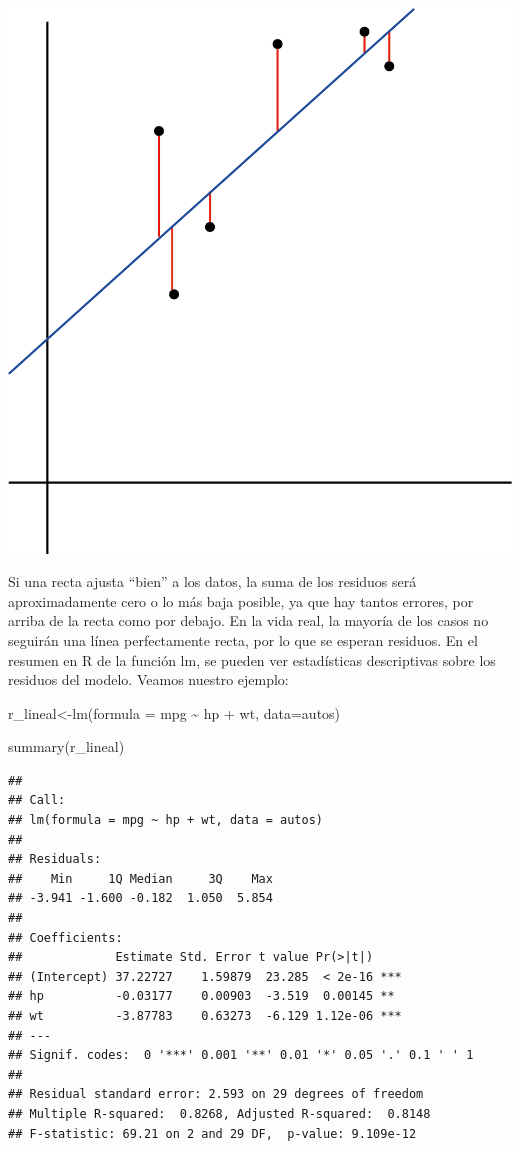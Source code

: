 \documentclass[
]{book}
\newenvironment{Shaded}{\begin{snugshade}}{\end{snugshade}}
\newcommand{\AttributeTok}[1]{\textcolor[rgb]{0.77,0.63,0.00}{#1}}
\newcommand{\FunctionTok}[1]{\textcolor[rgb]{0.00,0.00,0.00}{#1}}
\newcommand{\NormalTok}[1]{#1}
\newcommand{\OtherTok}[1]{\textcolor[rgb]{0.56,0.35,0.01}{#1}}
\newcommand{\SpecialCharTok}[1]{\textcolor[rgb]{0.00,0.00,0.00}{#1}}
\begin{document}
\includegraphics[width=14.24in]{img/res}

Si una recta ajusta ``bien'' a los datos, la suma de los residuos será aproximadamente cero o lo más baja posible, ya que hay tantos errores, por arriba de la recta como por debajo. En la vida real, la mayoría de los casos no seguirán una línea perfectamente recta, por lo que se esperan residuos. En el resumen en R de la función lm, se pueden ver estadísticas descriptivas sobre los residuos del modelo. Veamos nuestro ejemplo:

\begin{Shaded}
\begin{Highlighting}[]
\NormalTok{r\_lineal}\OtherTok{\textless{}{-}}\FunctionTok{lm}\NormalTok{(}\AttributeTok{formula =}\NormalTok{ mpg }\SpecialCharTok{\textasciitilde{}}\NormalTok{ hp }\SpecialCharTok{+}\NormalTok{ wt, }\AttributeTok{data=}\NormalTok{autos)}

\FunctionTok{summary}\NormalTok{(r\_lineal)}
\end{Highlighting}
\end{Shaded}

\begin{verbatim}
## 
## Call:
## lm(formula = mpg ~ hp + wt, data = autos)
## 
## Residuals:
##    Min     1Q Median     3Q    Max 
## -3.941 -1.600 -0.182  1.050  5.854 
## 
## Coefficients:
##             Estimate Std. Error t value Pr(>|t|)    
## (Intercept) 37.22727    1.59879  23.285  < 2e-16 ***
## hp          -0.03177    0.00903  -3.519  0.00145 ** 
## wt          -3.87783    0.63273  -6.129 1.12e-06 ***
## ---
## Signif. codes:  0 '***' 0.001 '**' 0.01 '*' 0.05 '.' 0.1 ' ' 1
## 
## Residual standard error: 2.593 on 29 degrees of freedom
## Multiple R-squared:  0.8268, Adjusted R-squared:  0.8148 
## F-statistic: 69.21 on 2 and 29 DF,  p-value: 9.109e-12
\end{verbatim}
\end{document}
